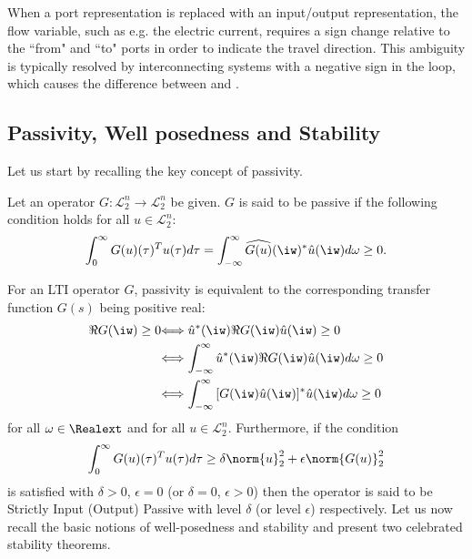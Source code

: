 \begin{rem}\label{rem:negsign}
When a port representation is replaced with an input/output representation, the flow variable, such as e.g. the electric current, requires a sign change relative to the ``from" and ``to" ports in order to indicate the travel direction. This ambiguity is typically resolved by interconnecting systems with a negative sign in the loop, which causes the difference between  and .
\end{rem}

%
\subsection{Passivity, Well posedness and Stability}
Let us start by recalling the key concept of passivity.
\begin{define} Let an operator $G: \mathcal{L}_{2}^n\to\mathcal{L}_{2}^n$ be given. $G$ is said to be passive if the following condition holds for all $u\in\mathcal{L}_{2}^n$:
\[
\int_0^\infty{G(u)(\tau)^Tu(\tau)d\tau} = \int_{-\infty}^\infty{\widehat{G(u)}(\iw)^*\hat{u}(\iw)d\omega} \geq 0.
\]\end{define}
For an LTI operator $G$, passivity is equivalent to the corresponding transfer function $G(s)$ being positive real:
\begin{align*}
{\Re{G(\iw)}\geq 0} &{\Longleftrightarrow
\hat{u}^*(\iw) \Re{G(\iw)}\hat{u}(\iw) \geq 0}\\
&{\Longleftrightarrow \int_{-\infty}^\infty{\hat{u}^*(\iw)\Re{G(\iw)} \hat{u}(\iw)d\omega} \geq 0}\\
&{\Longleftrightarrow \int_{-\infty}^\infty{{[G(\iw)\hat{u}(\iw)]^*}\hat{u}(\iw)d\omega} \geq 0}
\end{align*}
for all $\omega\in\Realext$ and for all $u\in\mathcal{L}_{2}^n$. Furthermore, if the condition
\[
\int_0^\infty{G(u)(\tau)^Tu(\tau)d\tau} \geq \delta\norm{u}_2^2 + \epsilon\norm{G(u)}_2^2
\]
is satisfied with {$\delta > 0$, $\epsilon = 0$ (or $\delta = 0$, $\epsilon > 0$) then the operator is said to be Strictly Input (Output) Passive with level $\delta$ (or level $\epsilon$) respectively.} {Let us now recall the} basic notions of well-posedness and stability and {present} two celebrated stability theorems.

